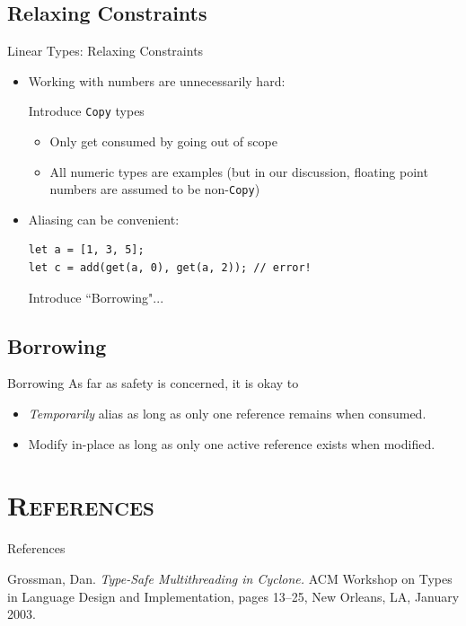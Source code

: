 \documentclass[xcolor=x11names,compress]{beamer}
\renewcommand{\(}{\begin{columns}}
\renewcommand{\)}{\end{columns}}
\newcommand{\<}[1]{\begin{column}{#1}}
\renewcommand{\>}{\end{column}}
\begin{document}
\subsection{Relaxing Constraints}
\begin{frame}[fragile]{Linear Types: Relaxing Constraints}
\begin{itemize}
\item Working with numbers are unnecessarily hard:

Introduce \texttt{Copy} types
\begin{itemize}
    \item Only get consumed by going out of scope
    \item All numeric types are examples (but in our discussion, floating point numbers are assumed to be non-\texttt{Copy})
\end{itemize}
\item Aliasing can be convenient:
\begin{lstlisting}
let a = [1, 3, 5];
let c = add(get(a, 0), get(a, 2)); // error!
\end{lstlisting}
Introduce ``Borrowing"...
\end{itemize}
\end{frame}

\subsection{Borrowing}
\begin{frame}{Borrowing}
As far as safety is concerned, it is okay to
\begin{itemize}
    \item \textit{Temporarily} alias as long as only one reference remains when consumed.
    \item Modify in-place as long as only one active reference exists when modified.
\end{itemize}
\end{frame}

\section*{\scshape References}
\begin{frame}{References}
\begin{thebibliography}{1}
Grossman, Dan. \textit{Type-Safe Multithreading in Cyclone.} ACM Workshop on Types in Language Design and Implementation, pages 13–25, New Orleans, LA, January 2003.
\end{thebibliography}
\end{frame}
\end{document}
